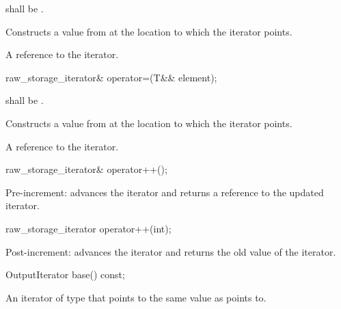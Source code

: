 \begin{itemdescr}
\pnum
\requires
{} shall be .

\pnum
\effects
Constructs a value from  at the location to which the iterator points.

\pnum
\returns
A reference to the iterator.
\end{itemdescr}

%
\begin{itemdecl}
raw_storage_iterator& operator=(T&& element);
\end{itemdecl}

\begin{itemdescr}
\pnum
\requires
{} shall be .

\pnum
\effects
Constructs a value from  at the location to which
the iterator points.

\pnum
\returns
A reference to the iterator.
\end{itemdescr}

%
\begin{itemdecl}
raw_storage_iterator& operator++();
\end{itemdecl}

\begin{itemdescr}
\pnum
\effects
Pre-increment:  advances the iterator and returns a reference to the updated iterator.
\end{itemdescr}

%
\begin{itemdecl}
raw_storage_iterator operator++(int);
\end{itemdecl}

\begin{itemdescr}
\pnum
\effects
Post-increment:  advances the iterator and returns the old value of the iterator.
\end{itemdescr}

%
\begin{itemdecl}
OutputIterator base() const;
\end{itemdecl}

\begin{itemdescr}
\pnum
\returns
An iterator of type  that points to the same value as
 points to.
\end{itemdescr}

